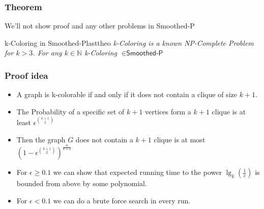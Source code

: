 \begin{frame}
    \frametitle{Theorem}

    We'll not show proof and any other problems in \textsf{Smoothed-P}
    
    \begin{theo}{k-Coloring in \textsf{Smoothed-P}}{lasttheo}
        \textit{\textsf{k-Coloring} is a known NP-Complete Problem for $k > 3$.
        For any $k \in \mathbb{N}$ \textsf{k-Coloring} $ \in \textsf{Smoothed-P}$}
    \end{theo}

\end{frame}

\begin{frame}
    \frametitle{Proof idea}
    
    \begin{itemize}
        \item A graph is \textsf{k-colorable} if and only if it does not contain a clique of size $k + 1$.
        \item The Probability of a specific set of $k + 1$ vertices form a $k + 1$ clique is at least $\epsilon^{\binom{k + 1}{2}}$
        \item Then the graph $G$ does not contain a $k + 1$ clique is at most $(1 - \epsilon^{\binom{k + 1}{2}})^{\frac{n}{k + 1}}$
        \item For $\epsilon \geq 0.1$ we can show that expected running time to the power $\lg_k(\frac{1}{c})$ is bounded from above by some polynomial.
        \item For $\epsilon < 0.1$ we can do a brute force search in every run.
    \end{itemize}

\end{frame}